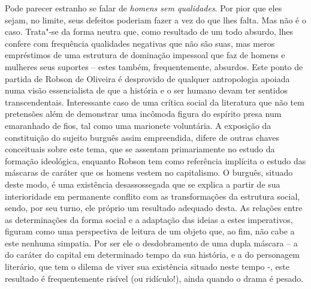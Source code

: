 {Pode parecer estranho se falar de \emph{homens sem qualidades}. Por pior
que eles sejam, no limite, seus defeitos poderiam fazer a vez do que
lhes falta. Mas não é o caso. Trata"-se da forma neutra que, como
resultado de um todo absurdo, lhes confere com frequência qualidades
negativas que não são suas, mas meros empréstimos de uma estrutura de
dominação impessoal que faz de homens e mulheres seus suportes -- estes
também, frequentemente, absurdos. Este ponto de partida de Robson de
Oliveira é desprovido de qualquer antropologia apoiada numa visão
essencialista de que a história e o ser humano devam ter sentidos
transcendentais. Interessante caso de uma crítica social da literatura
que não tem pretensões além de demonstrar uma incômoda figura do
espírito presa num emaranhado de fios, tal como uma marionete
voluntária. A exposição da constituição do sujeito burguês assim
empreendida, difere de outras chaves conceituais sobre este tema, que se
assentam primariamente no estudo da formação ideológica, enquanto Robson
tem como referência implícita o estudo das máscaras de caráter que os
homens vestem no capitalismo. O burguês, situado deste modo, é uma
existência desassossegada que se explica a partir de sua interioridade
em permanente conflito com as transformações da estrutura social, sendo,
por seu turno, ele próprio um resultado adequado desta. As relações
entre as determinações da forma social e a adaptação das ideias a estes
imperativos, figuram como uma perspectiva de leitura de um objeto que,
ao fim, não cabe a este nenhuma simpatia. Por ser ele o desdobramento de
uma dupla máscara -- a do caráter do capital em determinado tempo da sua
história, e a do personagem literário, que tem o dilema de viver sua
existência situado neste tempo -, este resultado é frequentemente
risível (ou ridículo!), ainda quando o drama é pesado.

}
